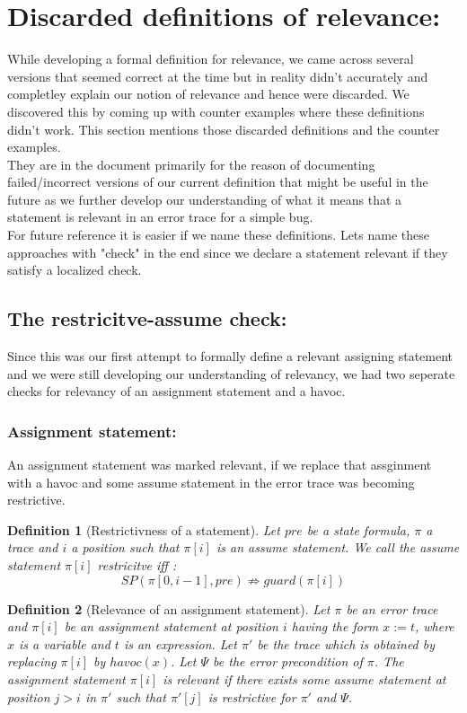 \documentclass{article}
\newcommand{\limp}{\Rightarrow}
\newtheorem{mydef}{Definition}
\begin{document}
\section{Discarded definitions of relevance:}
While developing a formal definition for relevance, we came across several versions that seemed correct at the time but in reality didn't accurately and completley explain our notion of relevance and hence were discarded. We discovered this by coming up with counter examples where these definitions didn't work. This section mentions those discarded definitions and the counter examples.\\ 
They are in the document primarily for the reason of documenting failed/incorrect versions of our current definition that might be useful in the future as we further develop our understanding of what it means that a statement is relevant in an error trace for a simple bug. \\
For future reference it is easier if we name these definitions. Lets name these approaches with "check" in the end since we declare a statement relevant if they satisfy a localized check. 
\subsection{The restricitve-assume check:}
Since this was our first attempt to formally define a relevant assigning statement and we were still developing our understanding of relevancy, we had two seperate checks for relevancy of an assignment statement and a havoc.
\subsubsection{Assignment statement:}
An assignment statement was marked relevant, if we replace that assginment with a havoc and some assume statement in the error trace was becoming restrictive.
\begin{mydef}[Restrictivness of a statement]
Let $pre$ be a state formula, $\pi$ a trace and $i$ a position such that $\pi[i]$ is an assume statement. We call the assume statement $\pi[i]$ \emph{restricitve} iff :
$$SP(\pi[0,i-1], pre) \not \limp guard(\pi[i])$$
\end{mydef}

\begin{mydef}[Relevance of an assignment statement]
Let $\pi$ be an error trace and $\pi[i]$ be an assignment statement at position $i$ having the form $x:=t$, where $x$ is a variable and $t$ is an expression. Let $\pi'$ be the trace which is obtained by replacing $\pi[i]$ by  $havoc(x)$. Let $\Psi$ be the error precondition of $\pi$. The assignment statement $\pi[i]$ is \emph{relevant} if there exists some assume statement at position $j > i$ in $\pi'$ such that $\pi'[j]$ is restrictive for $\pi'$ and $\Psi$. 
\end{mydef}
\end{document}
